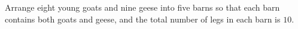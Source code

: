 Arrange eight young goats and nine geese into five barns so that each barn contains both goats and geese, and the total number of legs in each barn is $10$.
